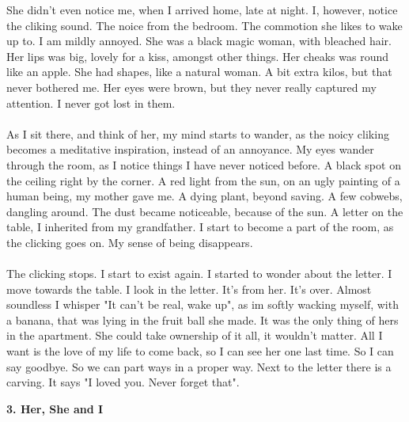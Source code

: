\documentclass[]{article}
\begin{document}
She didn't even notice me, when I arrived home, late at night. I, however, notice the cliking sound. The noice from the bedroom. The commotion she likes to wake up to. I am mildly annoyed. She was a black magic woman, with bleached hair. Her lips was big, lovely for a kiss, amongst other things. Her cheaks was round like an apple. She had shapes, like a natural woman. A bit extra kilos, but that never bothered me. Her eyes were brown, but they never really captured my attention. I never got lost in them. 
\\ \\
As I sit there, and think of her, my mind starts to wander, as the noicy cliking  becomes a meditative inspiration, instead of an annoyance. My eyes wander through the room, as I notice things I have never noticed before. A black spot on the ceiling right by the corner. A red light from the sun, on an ugly painting of a human being, my mother gave me. A dying plant, beyond saving. A few cobwebs, dangling around. The dust became noticeable, because of the sun. A letter on the table, I inherited from my grandfather. I start to become a part of the room, as the clicking goes on. My sense of being disappears. 
\\ \\
The clicking stops. I start to exist again. I started to wonder about the letter. I move towards the table. I look in the letter. It's from her. It's over. Almost soundless I whisper "It can't be real, wake up", as im softly wacking myself, with a banana, that was lying in the fruit ball she made. It was the only thing of hers in the apartment. She could take ownership of it all, it wouldn't matter. All I want is the love of my life to come back, so I can see her one last time. So I can say goodbye. So we can part ways in a proper way. Next to the letter there is a carving. It says "I loved you. Never forget that".

\begin{center}
	\large\textbf{3. Her, She and I}
\end{center}
\end{document}
